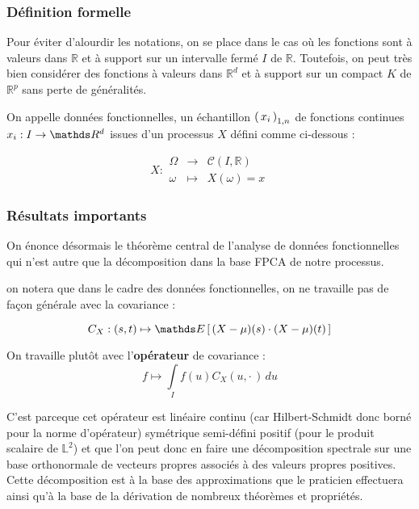 \subsubsection{Définition formelle}

Pour éviter d'alourdir les notations, on se place dans le cas où les fonctions sont à valeurs dans $\mathds R$ et à support sur un intervalle fermé $I$ de $\mathds R$. Toutefois, on peut très bien considérer des fonctions à valeurs dans $\mathds R^d$ et à support sur un compact $K$ de $\mathds R^p$ sans perte de généralités.

\begin{definition}

    On appelle données fonctionnelles, un échantillon $\left( \, {x} _ {i} \, \right)_{1, n}$ de fonctions continues $x_i : I \rightarrow \R d$ issues d'un processus $X$ défini comme ci-dessous :

    $$X : 
    \begin{array}{ccc}
        \Omega & \longrightarrow & \mathcal C(I, \mathds R)
        \\
        \omega & \longmapsto & X(\omega) = x 
    \end{array}
    $$

\end{definition}

\subsubsection{Résultats importants}

On énonce désormais le théorème central de l'analyse de données fonctionnelles qui n'est autre que la décomposition dans la base FPCA de notre processus.

\begin{rem}
    on notera que dans le cadre des données fonctionnelles, on ne travaille pas de façon générale avec la covariance :
    
    $$C_X : (s,t) \mapsto \esperance{ (X - \mu)(s) \cdot (X - \mu)(t) }$$
    
    On travaille plutôt avec l'\textbf{opérateur} de covariance :
    $$f \mapsto \int\limits_I f(u)C_X(u, \cdot \,) \,du$$ 
    
    C'est parceque cet opérateur est linéaire continu (car Hilbert-Schmidt donc borné pour la norme d'opérateur) symétrique semi-défini positif (pour le produit scalaire de $\mathds L^2$) et que l'on peut donc en faire une décomposition spectrale sur une base orthonormale de vecteurs propres associés à des valeurs propres positives. Cette décomposition est à la base des approximations que le praticien effectuera ainsi qu'à la base de la dérivation de nombreux théorèmes et propriétés.
\end{rem}

